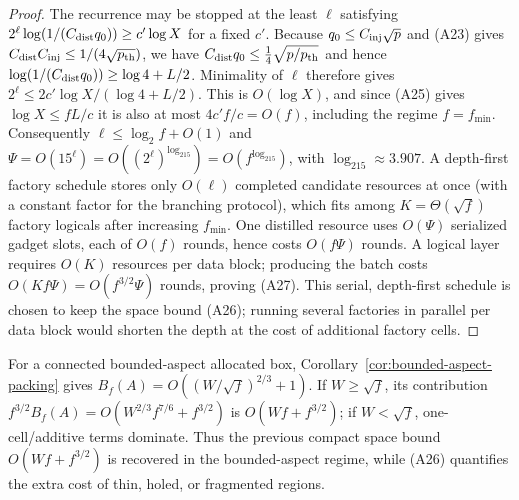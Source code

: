 \documentclass[aps,prx,reprint,superscriptaddress,nofootinbib,floatfix,longbibliography]{revtex4-2}
\theoremstyle{definition}
\begin{document}
\begin{proof}
The recurrence may be stopped at the least $\ell$ satisfying
$2^\ell\log(1/(C_{\rm dist}q_0))\geq c'\log X$ for a fixed $c'$.
Because $q_0\leq C_{\rm inj}\sqrt p$ and (A23) gives
$C_{\rm dist}C_{\rm inj}\leq1/(4\sqrt{p_{\rm th}})$, we have
$C_{\rm dist}q_0\leq\tfrac14\sqrt{p/p_{\rm th}}$ and hence
$\log(1/(C_{\rm dist}q_0))\geq\log4+L/2$.  Minimality of $\ell$
therefore gives $2^\ell\leq 2c'\log X/(\log4+L/2)$.  This is $O(\log X)$,
and since (A25) gives $\log X\leq fL/c$ it is also at most $4c'f/c=O(f)$,
including the regime $f=f_{\min}$.  Consequently
$\ell\leq\log_2f+O(1)$ and
$\Psi=O(15^\ell)=O((2^\ell)^{\log_215})=O(f^{\log_215})$, with
$\log_215\approx3.907$.  A depth-first factory schedule
stores only $O(\ell)$ completed candidate resources at once (with a constant
factor for the branching protocol), which fits among $K=\Theta(\sqrt f)$
factory logicals after increasing $f_{\min}$.  One distilled resource uses $O(\Psi)$ serialized gadget slots, each of
$O(f)$ rounds, hence costs $O(f\Psi)$ rounds.  A logical layer requires
$O(K)$ resources per data block; producing the batch costs
$O(Kf\Psi)=O(f^{3/2}\Psi)$ rounds, proving (A27).  This serial,
depth-first schedule is chosen to keep the space bound (A26); running several
factories in parallel per data block would shorten the depth at the cost of
additional factory cells.
\end{proof}

For a connected bounded-aspect allocated box,
Corollary~\ref{cor:bounded-aspect-packing} gives
$B_f(A)=O((W/\sqrt f)^{2/3}+1)$.  If $W\ge\sqrt f$, its contribution
$f^{3/2}B_f(A)=O(W^{2/3}f^{7/6}+f^{3/2})$ is $O(Wf+f^{3/2})$; if
$W<\sqrt f$, one-cell/additive terms dominate.  Thus the previous compact
space bound $O(Wf+f^{3/2})$ is recovered in the bounded-aspect regime, while
(A26) quantifies the extra cost of thin, holed, or fragmented regions.
\end{document}
